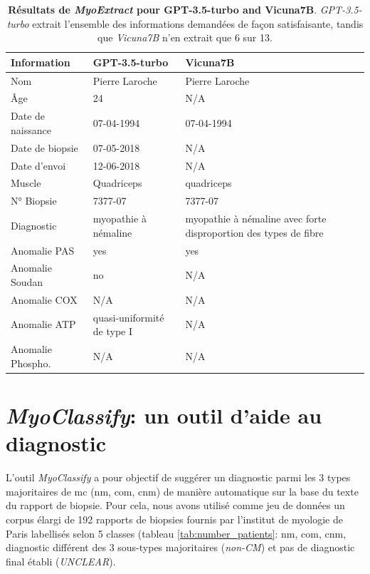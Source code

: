 \begin{table}[htbp]
\centering
\caption[Résultats de \textit{MyoExtract} pour \textit{GPT-3.5-turbo} and \textit{Vicuna7B}]{\textbf{Résultats de \textit{MyoExtract} pour GPT-3.5-turbo and Vicuna7B}. \textit{GPT-3.5-turbo} extrait l'ensemble des informations demandées de façon satisfaisante, tandis que \textit{Vicuna7B} n'en extrait que 6 sur 13.}
\label{tab:json_data}
\begin{tabularx}{\textwidth}{|l|X|X|}
\hline
\textbf{Information} & \textbf{GPT-3.5-turbo} & \textbf{Vicuna7B} \\ \hline
Nom & Pierre Laroche & Pierre Laroche \\ \hline
Âge & 24 & N/A \\ \hline
Date de naissance & 07-04-1994 & 07-04-1994 \\ \hline
Date de biopsie & 07-05-2018 & N/A \\ \hline
Date d'envoi & 12-06-2018 & N/A \\ \hline
Muscle & Quadriceps & quadriceps \\ \hline
N° Biopsie & 7377-07 & 7377-07 \\ \hline
Diagnostic & myopathie à némaline & myopathie à némaline avec forte disproportion des types de fibre \\ \hline
Anomalie PAS & yes & yes \\ \hline
Anomalie Soudan & no & N/A \\ \hline
Anomalie COX & N/A & N/A \\ \hline
Anomalie ATP & quasi-uniformité de type I & N/A \\ \hline
Anomalie Phospho. & N/A & N/A \\ \hline
\end{tabularx}
\end{table}

\section{\textit{MyoClassify}: un outil d'aide au diagnostic}
L'outil \textit{MyoClassify} a pour objectif de suggérer un diagnostic parmi les 3 types majoritaires de \gls{mc} (\gls{nm}, \gls{com}, \gls{cnm}) de manière automatique sur la base du texte du rapport de biopsie. Pour cela, nous avons utilisé comme jeu de données un corpus élargi de 192 rapports de biopsies fournis par l'institut de myologie de Paris labellisés selon 5 classes (tableau \ref{tab:number_patients}: \gls{nm}, \gls{com}, \gls{cnm}, diagnostic différent des 3 sous-types majoritaires (\textit{non-CM}) et pas de diagnostic final établi (\textit{UNCLEAR}).


